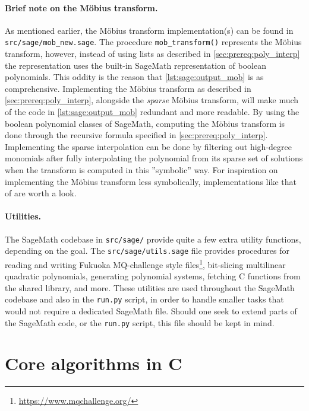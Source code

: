 \paragraph{Brief note on the Möbius transform.} As mentioned earlier, the Möbius transform implementation(s) can be found in \texttt{src/sage/mob\_new.sage}. The procedure \texttt{mob\_transform()} represents the Möbius transform, however, instead of using lists as described in \cref{sec:prereq:poly_interp} the representation uses the built-in SageMath representation of boolean polynomials. This oddity is the reason that \cref{lst:sage:output_mob} is as comprehensive. Implementing the Möbius transform as described in \cref{sec:prereq:poly_interp}, alongside the \textit{sparse} Möbius transform, will make much of the code in \cref{lst:sage:output_mob} redundant and more readable. By using the boolean polynomial classes of SageMath, computing the Möbius transform is done through the recursive formula specified in \cref{sec:prereq:poly_interp}. Implementing the sparse interpolation can be done by filtering out high-degree monomials after fully interpolating the polynomial from its sparse set of solutions when the transform is computed in this ''symbolic'' way. For inspiration on implementing the Möbius transform less symbolically, implementations like that of \cite{cryptoeprint:2022/1412} are worth a look.

\paragraph{Utilities.} The SageMath codebase in \texttt{src/sage/} provide quite a few extra utility functions, depending on the goal. The \texttt{src/sage/utils.sage} file provides procedures for reading and writing Fukuoka MQ-challenge style files\footnote{\url{https://www.mqchallenge.org/}}, bit-slicing multilinear quadratic polynomials, generating polynomial systems, fetching C functions from the shared library, and more. These utilities are used throughout the SageMath codebase and also in the \texttt{run.py} script, in order to handle smaller tasks that would not require a dedicated SageMath file. Should one seek to extend parts of the SageMath code, or the \texttt{run.py} script, this file should be kept in mind.

\section{Core algorithms in C} \label{sec:impl:c}

